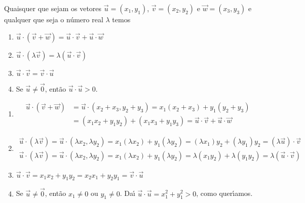 \begin{proposicao}\label{propriedades-produto-interno}
  Quaisquer que sejam os vetores $\vec{u} = (x_1, y_1)$, $\vec{v} = (x_2, y_2)$ e $\vec{w} = (x_3, y_3)$ e qualquer que seja o n\'umero real $\lambda$ temos
  \begin{enumerate}[label=({\roman*})]
    \item\label{linearidade-produto-interno} $\vec{u}\cdot(\vec{v} + \vec{w}) = \vec{u}\cdot\vec{v} + \vec{u}\cdot\vec{w}$
    \item\label{linearidade2-produto-interno} $\vec{u}\cdot(\lambda\vec{v}) = \lambda(\vec{u}\cdot\vec{v})$
    \item $\vec{u}\cdot\vec{v} = \vec{v}\cdot\vec{u}$
    \item Se $\vec{u} \ne \vec{0}$, ent\~ao $\vec{u}\cdot\vec{u} > 0$.
  \end{enumerate}
\end{proposicao}
\begin{prova}
  \begin{enumerate}[label=({\roman*})]
    \item \begin{align*}
      \vec{u}\cdot(\vec{v} + \vec{w}) &= \vec{u}\cdot(x_2 + x_3, y_2 + y_3) = x_1(x_2 + x_3) + y_1(y_2 + y_3) \\ &= (x_1x_2 + y_1y_2) + (x_1x_3 + y_1y_3) = \vec{u}\cdot\vec{v} + \vec{u}\cdot\vec{w}
    \end{align*}
    \item \begin{align*}
      \vec{u}\cdot(\lambda\vec{v}) = \vec{u}\cdot(\lambda x_2, \lambda y_2) = x_1(\lambda x_2) + y_1(\lambda y_2) = (\lambda x_1)y_2 + (\lambda y_1)y_2 = (\lambda\vec{u})\cdot\vec{v}\\
      \vec{u}\cdot(\lambda\vec{v}) = \vec{u}\cdot(\lambda x_2, \lambda y_2) = x_1(\lambda x_2) + y_1(\lambda y_2) = \lambda (x_1y_2) + \lambda (y_1y_2) = \lambda(\vec{u}\cdot\vec{v})
    \end{align*}
    \item $\vec{u}\cdot\vec{v} = x_1x_2 + y_1y_2 = x_2x_1 + y_2y_1 = \vec{v}\cdot\vec{u}$
    \item Se $\vec{u} \ne \vec{0}$, ent\~ao $x_1 \ne 0$ ou $y_1 \ne 0$. Da{\'\i} $\vec{u}\cdot\vec{u} = x_1^2 + y_1^2 > 0$, como quer{\'\i}amos.
  \end{enumerate}
\end{prova}

